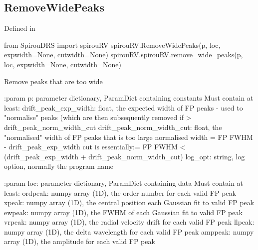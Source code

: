 \noindent\begin{minipage}{\textwidth}
\subsection{RemoveWidePeaks}

Defined in \spirouRV{}

\begin{pythonbox}
from SpirouDRS import spirouRV
spirouRV.RemoveWidePeaks(p, loc, expwidth=None, cutwidth=None)
spirouRV.spirouRV.remove_wide_peaks(p, loc, expwidth=None, cutwidth=None)
\end{pythonbox}

\begin{pythondocstring}
Remove peaks that are too wide

:param p: parameter dictionary, ParamDict containing constants
    Must contain at least:
            drift_peak_exp_width: float, the expected width of FP peaks -
                                  used to "normalise" peaks (which are then
                                  subsequently removed if >
                                  drift_peak_norm_width_cut
            drift_peak_norm_width_cut: float, the "normalised" width of
                                       FP peaks that is too large
                                       normalised width = FP FWHM -
                                       drift_peak_exp_width cut is
                                       essentially:=
                                       FP FWHM < (drift_peak_exp_width +
                                       drift_peak_norm_width_cut)
            log_opt: string, log option, normally the program name

:param loc: parameter dictionary, ParamDict containing data
        Must contain at least:
            ordpeak: numpy array (1D), the order number for each valid FP
                     peak
            xpeak: numpy array (1D), the central position each Gaussian fit
                   to valid FP peak
            ewpeak: numpy array (1D), the FWHM of each Gaussian fit
                    to valid FP peak
            vrpeak: numpy array (1D), the radial velocity drift for each
                    valid FP peak
            llpeak: numpy array (1D), the delta wavelength for each valid
                    FP peak
            amppeak: numpy array (1D), the amplitude for each valid FP peak


\end{pythondocstring}
\end{minipage}
